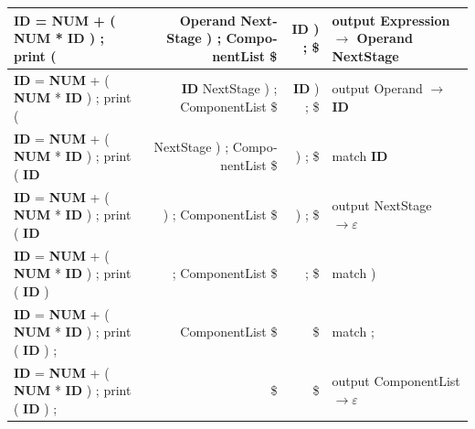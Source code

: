 \documentclass{article}
\begin{document}
\begin{latin}
\begin{table}[H]
{\begin{tabular}{|l|r|r|l|}
\textbf{ID} = \textbf{NUM} + ( \textbf{NUM} * \textbf{ID} ) ; print (                 & Operand NextStage ) ; ComponentList \$      & \textbf{ID} ) ; \$                                                                       & output Expression $\longrightarrow$ Operand NextStage            \\ \hline
\textbf{ID} = \textbf{NUM} + ( \textbf{NUM} * \textbf{ID} ) ; print (                 & \textbf{ID} NextStage ) ; ComponentList \$  & \textbf{ID} ) ; \$                                                                       & output Operand $\longrightarrow$ \textbf{ID}                     \\ \hline
\textbf{ID} = \textbf{NUM} + ( \textbf{NUM} * \textbf{ID} ) ; print ( \textbf{ID}     & NextStage ) ; ComponentList \$              & ) ; \$                                                                                   & match \textbf{ID}                                               \\ \hline
\textbf{ID} = \textbf{NUM} + ( \textbf{NUM} * \textbf{ID} ) ; print ( \textbf{ID}     & ) ; ComponentList \$                        & ) ; \$                                                                                   & output NextStage $\longrightarrow \varepsilon$                   \\ \hline
\textbf{ID} = \textbf{NUM} + ( \textbf{NUM} * \textbf{ID} ) ; print ( \textbf{ID} )   & ; ComponentList \$                          & ; \$                                                                                     & match )                                                         \\ \hline
\textbf{ID} = \textbf{NUM} + ( \textbf{NUM} * \textbf{ID} ) ; print ( \textbf{ID} ) ; & ComponentList \$                            & \$                                                                                       & match ;                                                         \\ \hline
\textbf{ID} = \textbf{NUM} + ( \textbf{NUM} * \textbf{ID} ) ; print ( \textbf{ID} ) ; & \$                                          & \$                                                                                       & output ComponentList $\longrightarrow \varepsilon$               \\ \hline
\end{tabular}%
}
\end{table}
\end{latin}
\end{document}
